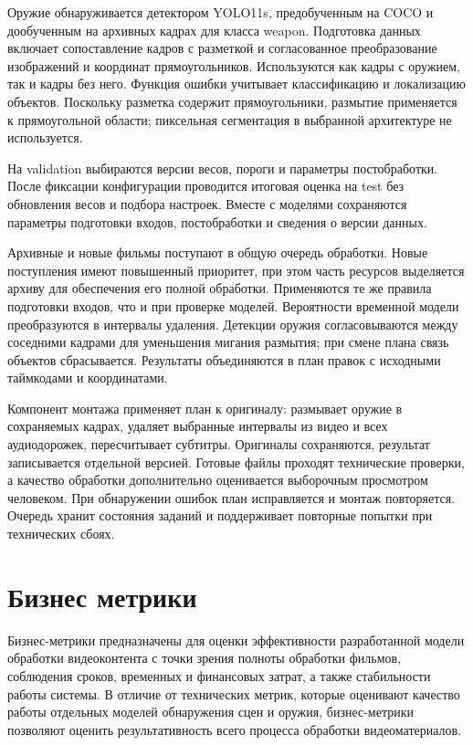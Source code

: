 \documentclass[a4paper,14pt]{extarticle}
\begin{document}
    Оружие обнаруживается детектором YOLO11s, предобученным на COCO и дообученным на архивных кадрах для класса weapon. 
    Подготовка данных включает сопоставление кадров с разметкой и согласованное преобразование изображений и координат прямоугольников. 
    Используются как кадры с оружием, так и кадры без него. 
    Функция ошибки учитывает классификацию и локализацию объектов. 
    Поскольку разметка содержит прямоугольники, размытие применяется к прямоугольной области; пиксельная сегментация в выбранной архитектуре не используется.

    На validation выбираются версии весов, пороги и параметры постобработки. 
    После фиксации конфигурации проводится итоговая оценка на test без обновления весов и подбора настроек. 
    Вместе с моделями сохраняются параметры подготовки входов, постобработки и сведения о версии данных.

    Архивные и новые фильмы поступают в общую очередь обработки. 
    Новые поступления имеют повышенный приоритет, при этом часть ресурсов выделяется архиву для обеспечения его полной обработки. 
    Применяются те же правила подготовки входов, что и при проверке моделей. 
    Вероятности временной модели преобразуются в интервалы удаления. 
    Детекции оружия согласовываются между соседними кадрами для уменьшения мигания размытия; при смене плана связь объектов сбрасывается. 
    Результаты объединяются в план правок с исходными таймкодами и координатами.

    Компонент монтажа применяет план к оригиналу: размывает оружие в сохраняемых кадрах, удаляет выбранные интервалы из видео и всех аудиодорожек, пересчитывает субтитры. 
    Оригиналы сохраняются, результат записывается отдельной версией. 
    Готовые файлы проходят технические проверки, а качество обработки дополнительно оценивается выборочным просмотром человеком. 
    При обнаружении ошибок план исправляется и монтаж повторяется. 
    Очередь хранит состояния заданий и поддерживает повторные попытки при технических сбоях.

    \section{Бизнес метрики}
    Бизнес-метрики предназначены для оценки эффективности разработанной модели обработки видеоконтента с точки зрения полноты обработки фильмов, соблюдения сроков, временных и финансовых затрат, а также стабильности работы системы. 
    В отличие от технических метрик, которые оценивают качество работы отдельных моделей обнаружения сцен и оружия, бизнес-метрики позволяют оценить результативность всего процесса обработки видеоматериалов.
\end{document}
